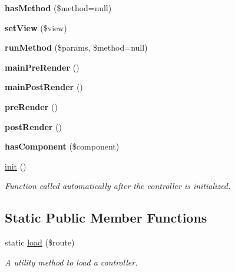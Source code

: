 \begin{DoxyCompactItemize}
\item 
\hypertarget{class_controller_a6763b9873e40beca4551ba6b2737f079}{
{\bfseries hasMethod} (\$method=null)}
\label{class_controller_a6763b9873e40beca4551ba6b2737f079}

\item 
\hypertarget{class_controller_acd67cab82343f59fae539edef2d4bc50}{
{\bfseries setView} (\$view)}
\label{class_controller_acd67cab82343f59fae539edef2d4bc50}

\item 
\hypertarget{class_controller_aab48ce68b0c0df911be982b2012646a9}{
{\bfseries runMethod} (\$params, \$method=null)}
\label{class_controller_aab48ce68b0c0df911be982b2012646a9}

\item 
\hypertarget{class_controller_a7d310a995390f11a548905def70c7322}{
{\bfseries mainPreRender} ()}
\label{class_controller_a7d310a995390f11a548905def70c7322}

\item 
\hypertarget{class_controller_a691d45ba371415b15421158023889a49}{
{\bfseries mainPostRender} ()}
\label{class_controller_a691d45ba371415b15421158023889a49}

\item 
\hypertarget{class_controller_a1d0b447a7989164d4f849969cd09619f}{
{\bfseries preRender} ()}
\label{class_controller_a1d0b447a7989164d4f849969cd09619f}

\item 
\hypertarget{class_controller_addbb3896d56965cccd940802c46f5b31}{
{\bfseries postRender} ()}
\label{class_controller_addbb3896d56965cccd940802c46f5b31}

\item 
\hypertarget{class_controller_a1e3b1c1ee371b348c680362f4d446b24}{
{\bfseries hasComponent} (\$component)}
\label{class_controller_a1e3b1c1ee371b348c680362f4d446b24}

\item 
\hyperlink{class_controller_af71b414389f649229743b8e8b16e1ee8}{init} ()
\begin{DoxyCompactList}\small\item\em Function called automatically after the controller is initialized. \item\end{DoxyCompactList}\end{DoxyCompactItemize}
\subsection*{Static Public Member Functions}
\begin{DoxyCompactItemize}
\item 
static \hyperlink{class_controller_a3a4733e0d493702d5500d8aa14083a17}{load} (\$route)
\begin{DoxyCompactList}\small\item\em A utility method to load a controller. \item\end{DoxyCompactList}\end{DoxyCompactItemize}
